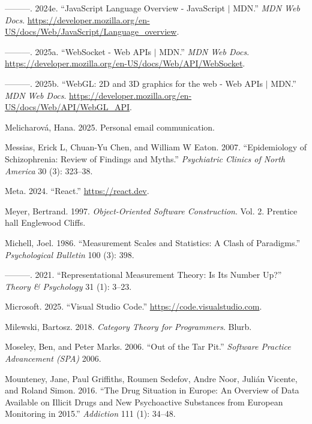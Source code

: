 \documentclass[
  openany]{book}
\newlength{\cslhangindent}
\newenvironment{CSLReferences}[2] %
 {\begin{list}{}{%
  \setlength{\itemindent}{0pt}
  \setlength{\leftmargin}{0pt}
  \setlength{\parsep}{0pt}
  \ifodd #1
   \setlength{\leftmargin}{\cslhangindent}
   \setlength{\itemindent}{-1\cslhangindent}
  \fi
  \setlength{\itemsep}{#2\baselineskip}}}
 {\end{list}}
\theoremstyle{definition}
\theoremstyle{definition}
\theoremstyle{definition}
\theoremstyle{definition}
\theoremstyle{remark}
\begin{document}
\begin{CSLReferences}{1}{0}
---------. 2024e. {``JavaScript Language Overview - JavaScript {\(\vert\)} MDN.''} \emph{MDN Web Docs}. \url{https://developer.mozilla.org/en-US/docs/Web/JavaScript/Language_overview}.

---------. 2025a. {``{WebSocket - Web APIs {\(\vert\)} MDN}.''} \emph{MDN Web Docs}. \url{https://developer.mozilla.org/en-US/docs/Web/API/WebSocket}.

---------. 2025b. {``{WebGL: 2D and 3D graphics for the web - Web APIs {\(\vert\)} MDN}.''} \emph{MDN Web Docs}. \url{https://developer.mozilla.org/en-US/docs/Web/API/WebGL_API}.

Melicharová, Hana. 2025. Personal email communication.

Messias, Erick L, Chuan-Yu Chen, and William W Eaton. 2007. {``Epidemiology of Schizophrenia: Review of Findings and Myths.''} \emph{Psychiatric Clinics of North America} 30 (3): 323--38.

Meta. 2024. {``React.''} \url{https://react.dev}.

Meyer, Bertrand. 1997. \emph{Object-Oriented Software Construction}. Vol. 2. Prentice hall Englewood Cliffs.

Michell, Joel. 1986. {``Measurement Scales and Statistics: A Clash of Paradigms.''} \emph{Psychological Bulletin} 100 (3): 398.

---------. 2021. {``Representational Measurement Theory: Is Its Number Up?''} \emph{Theory \& Psychology} 31 (1): 3--23.

Microsoft. 2025. {``{Visual Studio Code}.''} \url{https://code.visualstudio.com}.

Milewski, Bartosz. 2018. \emph{Category Theory for Programmers}. Blurb.

Moseley, Ben, and Peter Marks. 2006. {``Out of the Tar Pit.''} \emph{Software Practice Advancement (SPA)} 2006.

Mounteney, Jane, Paul Griffiths, Roumen Sedefov, Andre Noor, Julián Vicente, and Roland Simon. 2016. {``The Drug Situation in Europe: An Overview of Data Available on Illicit Drugs and New Psychoactive Substances from European Monitoring in 2015.''} \emph{Addiction} 111 (1): 34--48.


\end{CSLReferences}
\end{document}
